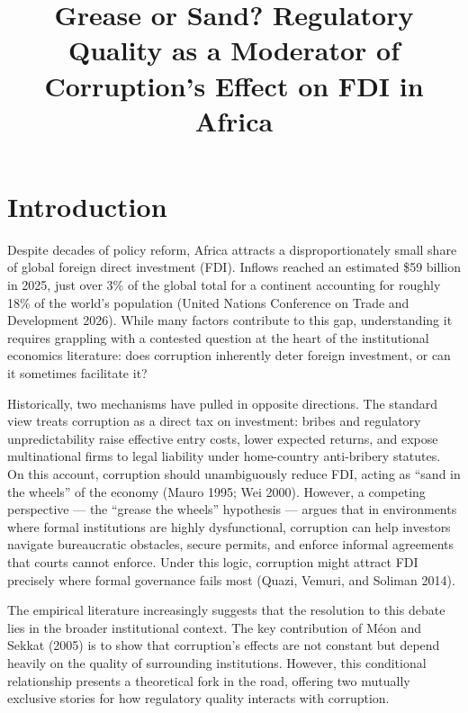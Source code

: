 \documentclass[
  12pt,
  letterpaper,
  DIV=11,
  numbers=noendperiod]{scrartcl}
\title{Grease or Sand? Regulatory Quality as a Moderator of Corruption's
Effect on FDI in Africa}
\author{}
\date{}
\renewcommand*\contentsname{Table of contents}
\newcommand\contentsname{Table of contents}
\begin{document}
\maketitle

\renewcommand*\contentsname{Table of contents}
{
\hypersetup{linkcolor=}
\setcounter{tocdepth}{3}
\tableofcontents
}

\section{Introduction}\label{introduction}

Despite decades of policy reform, Africa attracts a disproportionately
small share of global foreign direct investment (FDI). Inflows reached
an estimated \$59 billion in 2025, just over 3\% of the global total for
a continent accounting for roughly 18\% of the world's population
(United Nations Conference on Trade and Development 2026). While many
factors contribute to this gap, understanding it requires grappling with
a contested question at the heart of the institutional economics
literature: does corruption inherently deter foreign investment, or can
it sometimes facilitate it?

Historically, two mechanisms have pulled in opposite directions. The
standard view treats corruption as a direct tax on investment: bribes
and regulatory unpredictability raise effective entry costs, lower
expected returns, and expose multinational firms to legal liability
under home-country anti-bribery statutes. On this account, corruption
should unambiguously reduce FDI, acting as ``sand in the wheels'' of the
economy (Mauro 1995; Wei 2000). However, a competing perspective --- the
``grease the wheels'' hypothesis --- argues that in environments where
formal institutions are highly dysfunctional, corruption can help
investors navigate bureaucratic obstacles, secure permits, and enforce
informal agreements that courts cannot enforce. Under this logic,
corruption might attract FDI precisely where formal governance fails
most (Quazi, Vemuri, and Soliman 2014).

The empirical literature increasingly suggests that the resolution to
this debate lies in the broader institutional context. The key
contribution of Méon and Sekkat (2005) is to show that corruption's
effects are not constant but depend heavily on the quality of
surrounding institutions. However, this conditional relationship
presents a theoretical fork in the road, offering two mutually exclusive
stories for how regulatory quality interacts with corruption.
\end{document}
